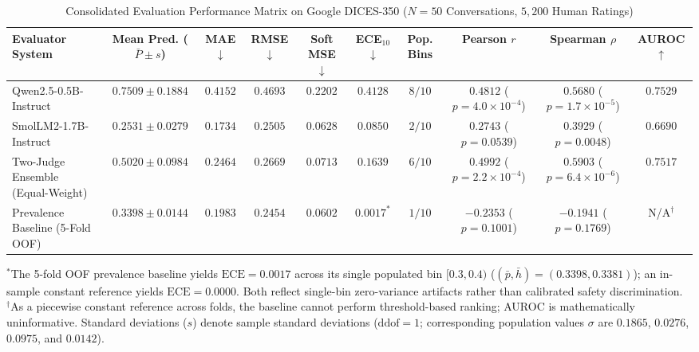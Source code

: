 \begin{table}[t]
\centering
\caption{Consolidated Evaluation Performance Matrix on Google DICES-350 ($N=50$ Conversations, $5,200$ Human Ratings)}
\label{tab:main_results}
\renewcommand{\arraystretch}{1.15}
\setlength{\tabcolsep}{5pt}
\begin{tabular}{lccccccccc}
\toprule
\textbf{Evaluator System} & \textbf{Mean Pred.} ($\bar{P}\pm s$) & \textbf{MAE} $\downarrow$ & \textbf{RMSE} $\downarrow$ & \textbf{Soft MSE} $\downarrow$ & \textbf{ECE}$_{10}$ $\downarrow$ & \textbf{Pop. Bins} & \textbf{Pearson} $r$ & \textbf{Spearman} $\rho$ & \textbf{AUROC} $\uparrow$ \\
\midrule
Qwen2.5-0.5B-Instruct & $0.7509 \pm 0.1884$ & $0.4152$ & $0.4693$ & $0.2202$ & $0.4128$ & $8/10$ & $0.4812$ ($p=4.0\times 10^{-4}$) & $0.5680$ ($p=1.7\times 10^{-5}$) & $\mathbf{0.7529}$ \\
SmolLM2-1.7B-Instruct & $0.2531 \pm 0.0279$ & $\mathbf{0.1734}$ & $0.2505$ & $0.0628$ & $0.0850$ & $2/10$ & $0.2743$ ($p=0.0539$) & $0.3929$ ($p=0.0048$) & $0.6690$ \\
Two-Judge Ensemble (Equal-Weight) & $0.5020 \pm 0.0984$ & $0.2464$ & $0.2669$ & $0.0713$ & $0.1639$ & $6/10$ & $\mathbf{0.4992}$ ($p=2.2\times 10^{-4}$) & $\mathbf{0.5903}$ ($p=6.4\times 10^{-6}$) & $0.7517$ \\
\midrule
Prevalence Baseline (5-Fold OOF) & $0.3398 \pm 0.0144$ & $0.1983$ & $\mathbf{0.2454}$ & $\mathbf{0.0602}$ & $0.0017^*$ & $1/10$ & $-0.2353$ ($p=0.1001$) & $-0.1941$ ($p=0.1769$) & N/A$^\dagger$ \\
\bottomrule
\end{tabular}
\begin{flushleft}
\footnotesize
$^*$The 5-fold OOF prevalence baseline yields $\text{ECE}=0.0017$ across its single populated bin $[0.3, 0.4)$ ($(\bar{p}, \bar{h})=(0.3398, 0.3381)$); an in-sample constant reference yields $\text{ECE}=0.0000$. Both reflect single-bin zero-variance artifacts rather than calibrated safety discrimination.\\
$^\dagger$As a piecewise constant reference across folds, the baseline cannot perform threshold-based ranking; AUROC is mathematically uninformative. Standard deviations ($s$) denote sample standard deviations ($\text{ddof}=1$; corresponding population values $\sigma$ are $0.1865$, $0.0276$, $0.0975$, and $0.0142$).
\end{flushleft}
\end{table}

